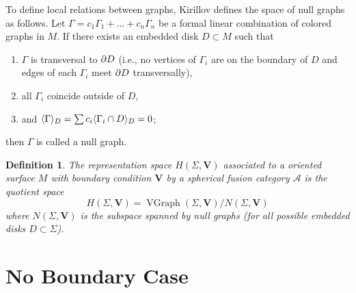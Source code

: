 \documentclass{amsart}
\newtheorem{prop}[thm]{Proposition}
\newtheorem{defn}[thm]{Definition}
\newcommand{\Hs}{H}
\DeclareMathOperator{\MCG}{MCG}
\DeclareMathOperator{\Homeo}{Homeo}
\DeclareMathOperator{\VGr}{VGraph}
\newcommand{\VV}{\mathbf{V}}       %
\newcommand{\Ga}{\Gamma}
\newcommand{\Si}{\Sigma}
\begin{document}
To define local relations between graphs, Kirillov defines the space of
null graphs as follows. Let
$\Ga=c_1\Ga_1+\dots+c_n\Ga_n$ be a formal linear
combination of colored graphs in $M$.  If there exists an embedded disk $D \subset M$ such that
\begin{enumerate}
  \item $\Ga$ is transversal to $\partial D$ (i.e., no vertices of $\Ga_i$ 
      are on the boundary of $D$ and edges of each $\Ga_i$ meet 
      $\partial D$ transversally),
  \item all $\Ga_i$ coincide outside of $D$,
  \item and $\<\Ga\>_D=\sum c_i\<\Ga_i\cap D\>_D=0$;
\end{enumerate}
then $\Ga$ is called a null graph. 

\begin{defn}
The representation space $\Hs(\Si, \VV)$ associated to a oriented surface $M$ with boundary condition $\VV$ by a spherical fusion category $\mathcal A$ is the quotient space
 $$
   \Hs(\Si, \VV)=\VGr(\Si, \VV)/N(\Si, \VV)
  $$
  where $N(\Si, \VV)$ is  the subspace spanned by null graphs 
  (for all possible embedded disks  $D\subset \Si$). 
\end{defn}

\section{No Boundary Case}


\end{document}

